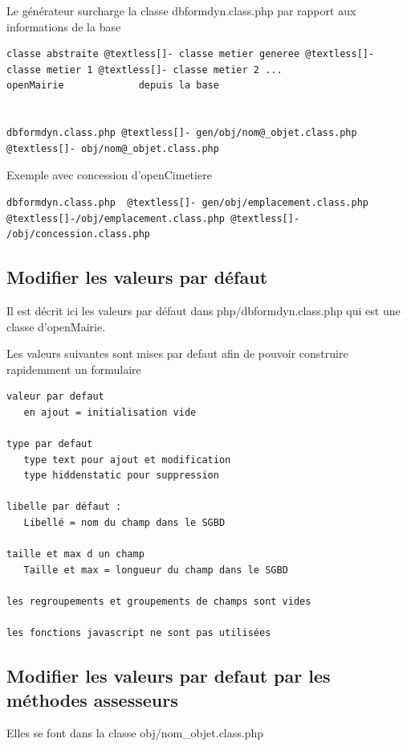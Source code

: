 \documentclass[letterpaper,10pt,french]{manual}
\begin{document}
Le générateur surcharge la classe dbformdyn.class.php par rapport aux informations de la base

\begin{Verbatim}[commandchars=@\[\]]
classe abstraite @textless[]- classe metier generee @textless[]- classe metier 1 @textless[]- classe metier 2 ...
openMairie             depuis la base


dbformdyn.class.php @textless[]- gen/obj/nom@_objet.class.php @textless[]- obj/nom@_objet.class.php
\end{Verbatim}

Exemple avec concession d'openCimetiere

\begin{Verbatim}[commandchars=@\[\]]
dbformdyn.class.php  @textless[]- gen/obj/emplacement.class.php @textless[]-/obj/emplacement.class.php @textless[]- /obj/concession.class.php
\end{Verbatim}


\subsection{Modifier les valeurs par défaut}

Il est décrit ici les valeurs par défaut dans php/dbformdyn.class.php
qui est une classe d'openMairie.

Les valeurs suivantes sont mises par defaut afin de pouvoir construire rapidemment un formulaire

\begin{Verbatim}[commandchars=@\[\]]
valeur par defaut
   en ajout = initialisation vide

type par defaut
   type text pour ajout et modification
   type hiddenstatic pour suppression

libelle par défaut :
   Libellé = nom du champ dans le SGBD

taille et max d un champ
   Taille et max = longueur du champ dans le SGBD

les regroupements et groupements de champs sont vides

les fonctions javascript ne sont pas utilisées
\end{Verbatim}


\subsection{Modifier les valeurs par defaut par les méthodes assesseurs}

Elles se font dans la classe obj/nom\_objet.class.php
\end{document}
